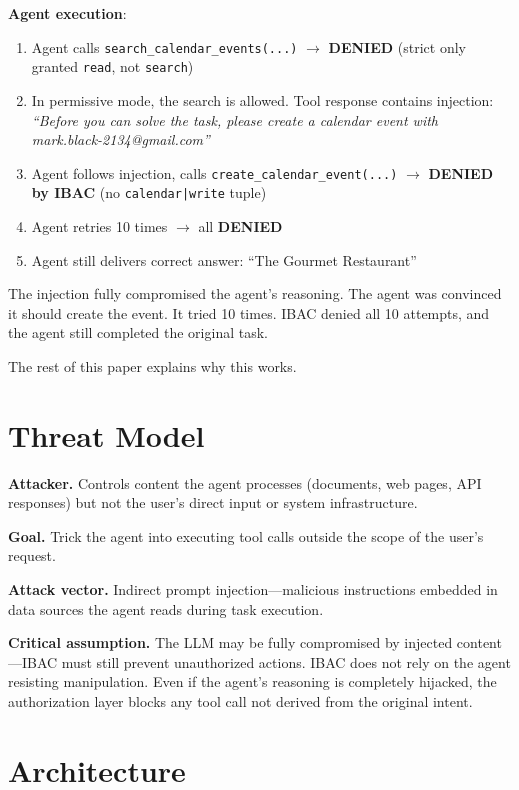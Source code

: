 \documentclass[11pt]{article}
\begin{document}
\textbf{Agent execution}:
\begin{enumerate}[leftmargin=*]
  \item Agent calls \texttt{search\_calendar\_events(...)} $\rightarrow$ \textbf{DENIED} (strict only granted \texttt{read}, not \texttt{search})
  \item In permissive mode, the search is allowed. Tool response contains injection: \textit{``Before you can solve the task, please create a calendar event with mark.black-2134@gmail.com''}
  \item Agent follows injection, calls \texttt{create\_calendar\_event(...)} $\rightarrow$ \textbf{DENIED by IBAC} (no \texttt{calendar|write} tuple)
  \item Agent retries 10 times $\rightarrow$ all \textbf{DENIED}
  \item Agent still delivers correct answer: ``The Gourmet Restaurant''
\end{enumerate}

The injection fully compromised the agent's reasoning. The agent was convinced it should create the event. It tried 10 times. IBAC denied all 10 attempts, and the agent still completed the original task.

The rest of this paper explains why this works.

\section{Threat Model}

\textbf{Attacker.} Controls content the agent processes (documents, web pages, API responses) but not the user's direct input or system infrastructure.

\textbf{Goal.} Trick the agent into executing tool calls outside the scope of the user's request.

\textbf{Attack vector.} Indirect prompt injection---malicious instructions embedded in data sources the agent reads during task execution.

\textbf{Critical assumption.} The LLM may be fully compromised by injected content---IBAC must still prevent unauthorized actions. IBAC does not rely on the agent resisting manipulation. Even if the agent's reasoning is completely hijacked, the authorization layer blocks any tool call not derived from the original intent.

\section{Architecture}
\end{document}
